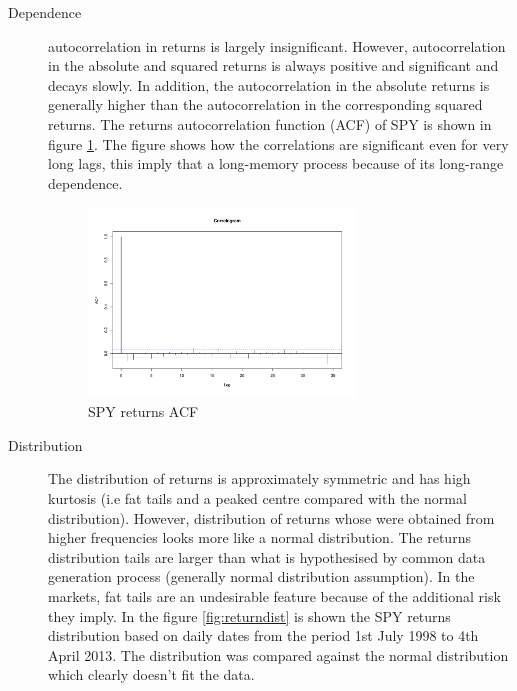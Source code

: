 \begin{description}
\item[Dependence] autocorrelation in returns is largely insignificant. However,
autocorrelation in the absolute and squared returns is always positive and
significant and decays slowly. In addition, the autocorrelation in the absolute
returns is generally higher than the autocorrelation in the corresponding
squared returns. The returns autocorrelation function (ACF) of SPY is shown in figure
 \ref{fig:returnacf}. The figure shows how the correlations are significant even
 for very long lags, this imply that a long-memory process because of its
 long-range dependence. 
 \begin{figure}[h]
 \centering
 \includegraphics[width=0.7\textwidth]{plots/spy_returns_acf.pdf}
 \caption{SPY returns ACF}
 \label{fig:returnacf}
\end{figure}
\item[Distribution] The distribution of returns is approximately symmetric and
has high kurtosis (i.e fat tails and a peaked centre compared with the normal
distribution). However, distribution of returns whose were obtained from higher
frequencies looks more like a normal distribution.
The returns distribution tails are larger than
 what is hypothesised by common data generation process (generally normal
 distribution assumption). In the markets, fat tails are an undesirable feature
 because of the additional risk they imply.  In the figure \ref{fig:returndist}
 is shown the SPY returns distribution based on daily dates from the period 1st
 July 1998 to 4th April 2013. The distribution was compared against the normal
 distribution which clearly doesn't fit the data.  
 \begin{figure}[h]
 \centering

\end{figure}
\end{description}
